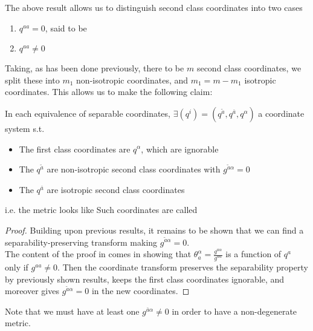 \documentclass{article}
\begin{document}
The above result allows us to distinguish second class coordinates into two cases
\begin{enumerate}
    \item $q^{aa} = 0$, said to be 
    \item $q^{aa} \neq 0$
\end{enumerate}
Taking, as has been done previously, there to be $m$ second class coordinates, we split these into $m_1$ non-isotropic coordinates, and $m_1= m-m_1$ isotropic coordinates. This allows us to make the following claim:

\begin{prop}
In each equivalence of separable coordinates, $\exists (q^i) = (q^{\tilde{a}}, q^{\bar{a}}, q^\alpha)$ a coordinate system s.t. 
\begin{itemize}
    \item The first class coordinates are $q^\alpha$, which are ignorable
    \item The $q^{\tilde{a}}$ are non-isotropic second class coordinates with $g^{\tilde{a}\alpha}=0$
    \item The $q^{\bar{a}}$ are isotropic second class coordinates
\end{itemize}
i.e. the metric looks like 
Such coordinates are called 
\end{prop}
\begin{proof}
Building upon previous results, it remains to be shown that we can find a separability-preserving transform making $g^{\tilde{a}\alpha} = 0$. \\
The content of the proof in \cite{Benenti1991} comes in showing that $\theta_a^\alpha = \frac{g^{a\alpha}}{g^{aa}}$ is a function of $q^a$ only if $g^{aa} \neq 0$. Then the coordinate transform 
preserves the separability property by previously shown results, keeps the first class coordinates ignorable, and moreover gives $g^{\tilde{a}\alpha}=0$ in the new coordinates. 
\end{proof}
\begin{remark}
Note that we must have at least one $g^{\bar{a}\alpha}\neq 0$ in order to have a non-degenerate metric. 
\end{remark}
\end{document}
